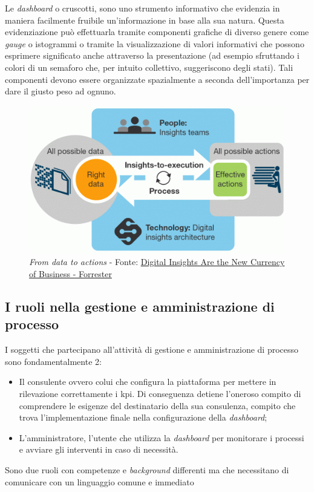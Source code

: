 Le \textit{dashboard} o cruscotti, sono uno strumento informativo che evidenzia in maniera facilmente fruibile un'informazione in base alla sua natura. Questa evidenziazione può effettuarla tramite componenti grafiche di diverso genere come \textit{gauge} o istogrammi o tramite la visualizzazione di valori informativi che possono esprimere significato  anche attraverso la presentazione (ad esempio sfruttando i colori di un semaforo che, per intuito collettivo, suggeriscono degli stati).
Tali componenti devono essere organizzate spazialmente a seconda dell'importanza per dare il giusto peso ad ognuno.
\begin{figure}[H]
    \centering
    \includegraphics[width=0.80\columnwidth]{immagini/from_data_to_insight.png}
    \caption{\textit{From data to actions} - Fonte: \href{https://go.forrester.com/blogs/15-04-27-digital_insights_are_the_new_currency_of_business/}{Digital Insights Are the New Currency of Business - Forrester}}
    \label{fig:dataToInsight}
\end{figure}
\newpage
\subsection{I ruoli nella gestione e amministrazione di processo}
I soggetti che partecipano all'attività di gestione e amministrazione di processo sono fondamentalmente 2:
\begin{itemize}
    \item Il consulente ovvero colui che configura la piattaforma per mettere in rilevazione correttamente i \acrshort{kpi}. Di conseguenza detiene l'oneroso compito di comprendere le esigenze del destinatario della sua consulenza, compito che trova l'implementazione finale nella configurazione della \textit{dashboard};
    \item L'amministratore, l'utente che utilizza la \textit{dashboard} per monitorare i processi e avviare gli interventi in caso di necessità.
\end{itemize}
Sono due ruoli con competenze e \textit{background} differenti ma che necessitano di comunicare con un linguaggio comune e immediato

